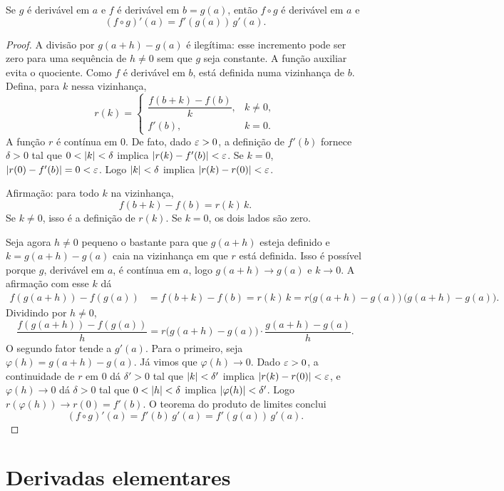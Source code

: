 \documentclass[11pt,a4paper]{article}
\begin{document}
\begin{teorema}[Cadeia]
\label{teo:cadeia}
Se $g$ \'e deriv\'avel em $a$ e $f$ \'e deriv\'avel em $b=g(a)$, ent\~ao $f\circ g$ \'e deriv\'avel em $a$ e
\[
(f\circ g)'(a)=f'(g(a))\,g'(a).
\]
\end{teorema}

\begin{proof}
A divis\~ao por $g(a+h)-g(a)$ \'e ileg\'itima: esse incremento pode ser zero para uma sequ\^encia de $h\neq 0$ sem que $g$ seja constante. A fun\c{c}\~ao auxiliar evita o quociente. Como $f$ \'e deriv\'avel em $b$, est\'a definida numa vizinhan\c{c}a de $b$. Defina, para $k$ nessa vizinhan\c{c}a,
\[
r(k)=\begin{cases}
\dfrac{f(b+k)-f(b)}{k}, & k\neq 0,\\[1mm]
f'(b), & k=0.
\end{cases}
\]
A fun\c{c}\~ao $r$ \'e cont\'inua em $0$. De fato, dado $\varepsilon>0$, a defini\c{c}\~ao de $f'(b)$ fornece $\delta>0$ tal que $0<\left\lvert k \right\rvert<\delta$ implica $\left\lvert r(k)-f'(b) \right\rvert<\varepsilon$. Se $k=0$, $\left\lvert r(0)-f'(b) \right\rvert=0<\varepsilon$. Logo $\left\lvert k \right\rvert<\delta$ implica $\left\lvert r(k)-r(0) \right\rvert<\varepsilon$.

Afirma\c{c}\~ao: para todo $k$ na vizinhan\c{c}a,
\[
f(b+k)-f(b)=r(k)\,k.
\]
Se $k\neq 0$, isso \'e a defini\c{c}\~ao de $r(k)$. Se $k=0$, os dois lados s\~ao zero.

Seja agora $h\neq 0$ pequeno o bastante para que $g(a+h)$ esteja definido e $k=g(a+h)-g(a)$ caia na vizinhan\c{c}a em que $r$ est\'a definida. Isso \'e poss\'ivel porque $g$, deriv\'avel em $a$, \'e cont\'inua em $a$, logo $g(a+h)\to g(a)$ e $k\to 0$. A afirma\c{c}\~ao com esse $k$ d\'a
\begin{align*}
f(g(a+h))-f(g(a))
&= f(b+k)-f(b)
= r(k)\,k
= r\bigl(g(a+h)-g(a)\bigr)\,\bigl(g(a+h)-g(a)\bigr).
\end{align*}
Dividindo por $h\neq 0$,
\[
\frac{f(g(a+h))-f(g(a))}{h}
= r\bigl(g(a+h)-g(a)\bigr)\cdot\frac{g(a+h)-g(a)}{h}.
\]
O segundo fator tende a $g'(a)$. Para o primeiro, seja $\varphi(h)=g(a+h)-g(a)$. J\'a vimos que $\varphi(h)\to 0$. Dado $\varepsilon>0$, a continuidade de $r$ em $0$ d\'a $\delta'>0$ tal que $\left\lvert k \right\rvert<\delta'$ implica $\left\lvert r(k)-r(0) \right\rvert<\varepsilon$, e $\varphi(h)\to 0$ d\'a $\delta>0$ tal que $0<\left\lvert h \right\rvert<\delta$ implica $\left\lvert \varphi(h) \right\rvert<\delta'$. Logo $r(\varphi(h))\to r(0)=f'(b)$. O teorema do produto de limites conclui
\[
(f\circ g)'(a)=f'(b)\,g'(a)=f'(g(a))\,g'(a).
\]
\end{proof}

\section{Derivadas elementares}
\label{sec:elementares}
\end{document}

